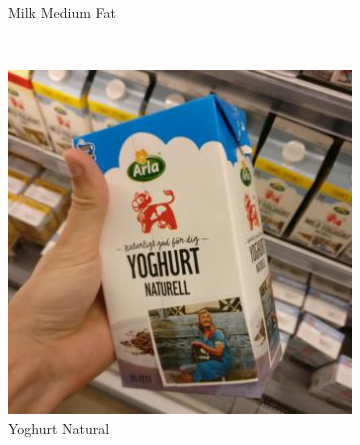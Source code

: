\begin{figure}[t]
\begin{minipage}[b]{0.47\textwidth}
\begin{subfigure}[t]{0.32\textwidth}
			\caption{Milk Medium Fat}
			\label{subfig:real-image-q}
		\end{subfigure}~
		\begin{subfigure}[t]{0.32\textwidth}
			\centering
			\includegraphics[width=\textwidth]{PaperA/dataset-figure/Arla-Natural-Yoghurt_031.jpg}
			\caption{Yoghurt Natural}
			\label{subfig:real-image-r}
		\end{subfigure}~ 
		\captionsetup{font=footnotesize}
		\vspace{-1mm}
		\caption{Examples of natural images in our dataset, where each image have been taken inside a grocery store. Image examples of fruits, vegetables and refrigerated products are presented in each row respectively.
		}
		\label{fig:dataset-figure}
	\end{minipage}
	\hspace{10pt}
	\begin{minipage}[b]{0.47\textwidth}
		\centering
		\captionsetup{font=scriptsize}
		\begin{subfigure}[t]{0.32\textwidth}
			\centering

\end{subfigure}
\end{minipage}
\end{figure}
